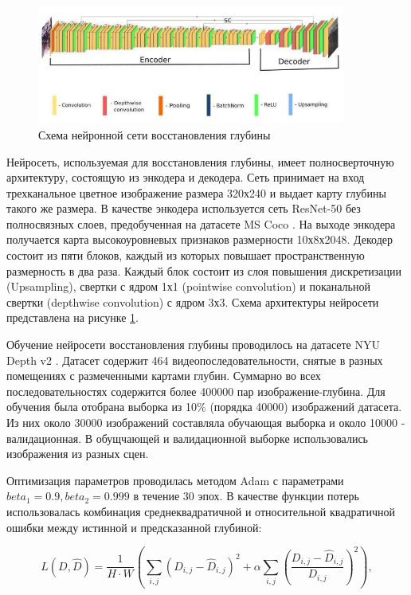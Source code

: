 \documentclass{mipt-thesis-ms}
\begin{document}
	\begin{figure}
		\centering
		\includegraphics[width=0.9\textwidth]{img/fcnn_scheme.png}
		\caption{Схема нейронной сети восстановления глубины}
		\label{figure_our_fcnn}
	\end{figure}
	
	Нейросеть, используемая для восстановления глубины, имеет полносверточную архитектуру, состоящую из энкодера и декодера. Сеть принимает на вход трехканальное цветное изображение размера 320х240 и выдает карту глубины такого же размера. В качестве энкодера используется сеть ResNet-50 \cite{he2016deep} без полносвязных слоев, предобученная на датасете MS Coco \cite{lin2014microsoft}. На выходе энкодера получается карта высокоуровневых признаков размерности 10х8х2048. Декодер состоит из пяти блоков, каждый из которых повышает пространственную размерность в два раза. Каждый блок состоит из слоя повышения дискретизации (Upsampling), свертки с ядром 1х1 (pointwise convolution) и поканальной свертки (depthwise convolution) с ядром 3х3. Схема архитектуры нейросети представлена на рисунке \ref{figure_our_fcnn}.
	
	Обучение нейросети восстановления глубины проводилось на датасете NYU Depth v2 \cite{silberman2012indoor}. Датасет содержит 464 видеопоследовательности, снятые в разных помещениях с размеченными картами глубин. Суммарно во всех последовательностях содержится более 400000 пар изображение-глубина. Для обучения была отобрана выборка из 10\% (порядка 40000) изображений датасета. Из них около 30000 изображений составляла обучающая выборка и около 10000 - валидационная. В обущчающей и валидационной выборке использовались изображения из разных сцен.
	
	Оптимизация параметров проводилась методом Adam \cite{kingma2014adam} с параметрами $beta_1 = 0.9, beta_2 = 0.999$ в течение 30 эпох. В качестве функции потерь использовалась комбинация среднеквадратичной и относительной квадратичной ошибки между истинной и предсказанной глубиной:
	
	\begin{equation}
		L(D, \widehat{D}) = \frac{1}{H \cdot W} (\sum\limits_{i,j} (D_{i,j} - \widehat{D}_{i,j})^2 + \alpha \sum\limits_{i,j} (\frac{D_{i,j} - \widehat{D}_{i,j}}{D_{i,j}})^2),
	\end{equation}
	
\end{document}
